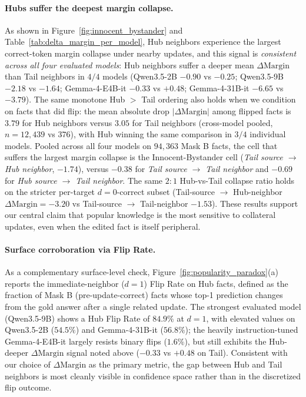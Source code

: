 \paragraph{Hubs suffer the deepest margin collapse.}
As shown in Figure~\ref{fig:innocent_bystander} and Table~\ref{tab:delta_margin_per_model}, Hub neighbors experience the largest correct-token margin collapse under nearby updates, and this signal is \emph{consistent across all four evaluated models}: Hub neighbors suffer a deeper mean $\Delta\mathrm{Margin}$ than Tail neighbors in $4/4$ models (Qwen3.5-2B $-0.90$ vs $-0.25$; Qwen3.5-9B $-2.18$ vs $-1.64$; Gemma-4-E4B-it $-0.33$ vs $+0.48$; Gemma-4-31B-it $-6.65$ vs $-3.79$). The same monotone Hub $>$ Tail ordering also holds when we condition on facts that did flip: the mean absolute drop $|\Delta\mathrm{Margin}|$ among flipped facts is $3.79$ for Hub neighbors versus $3.05$ for Tail neighbors (cross-model pooled, $n=12{,}439$ vs $376$), with Hub winning the same comparison in $3/4$ individual models. Pooled across all four models on $94{,}363$ Mask B facts, the cell that suffers the largest margin collapse is the Innocent-Bystander cell (\textit{Tail source $\rightarrow$ Hub neighbor}, $-1.74$), versus $-0.38$ for \textit{Tail source $\rightarrow$ Tail neighbor} and $-0.69$ for \textit{Hub source $\rightarrow$ Tail neighbor}. The same $2{:}1$ Hub-vs-Tail collapse ratio holds on the stricter per-target $d{=}0$-correct subset (Tail-source $\rightarrow$ Hub-neighbor $\Delta\mathrm{Margin}=-3.20$ vs Tail-source $\rightarrow$ Tail-neighbor $-1.53$). These results support our central claim that popular knowledge is the most sensitive to collateral updates, even when the edited fact is itself peripheral.



\paragraph{Surface corroboration via Flip Rate.}
As a complementary surface-level check, Figure~\ref{fig:popularity_paradox}(a) reports the immediate-neighbor ($d{=}1$) Flip Rate on Hub facts, defined as the fraction of Mask B (pre-update-correct) facts whose top-1 prediction changes from the gold answer after a single related update. The strongest evaluated model (Qwen3.5-9B) shows a Hub Flip Rate of $84.9\%$ at $d{=}1$, with elevated values on Qwen3.5-2B ($54.5\%$) and Gemma-4-31B-it ($56.8\%$); the heavily instruction-tuned Gemma-4-E4B-it largely resists binary flips ($1.6\%$), but still exhibits the Hub-deeper $\Delta\mathrm{Margin}$ signal noted above ($-0.33$ vs $+0.48$ on Tail). Consistent with our choice of $\Delta\mathrm{Margin}$ as the primary metric, the gap between Hub and Tail neighbors is most cleanly visible in confidence space rather than in the discretized flip outcome.

